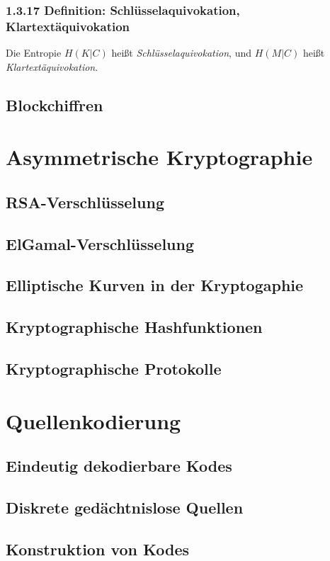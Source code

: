 \documentclass[12pt,a4paper]{scrartcl}
\begin{document}
            \subsubsection*{1.3.17 Definition: Schlüsselaquivokation, Klartextäquivokation}
                Die Entropie $H(K|C)$ heißt \emph{Schlüsselaquivokation}, und $H(M|C)$ heißt \emph{Klartextäquivokation}.
        \subsection{Blockchiffren}
    \section{Asymmetrische Kryptographie}
        \subsection{RSA-Verschlüsselung}
        \subsection{ElGamal-Verschlüsselung}
        \subsection{Elliptische Kurven in der Kryptogaphie}
        \subsection{Kryptographische Hashfunktionen}
        \subsection{Kryptographische Protokolle}
    \section{Quellenkodierung}
        \subsection{Eindeutig dekodierbare Kodes}
        \subsection{Diskrete gedächtnislose Quellen}
        \subsection{Konstruktion von Kodes}
\end{document}
